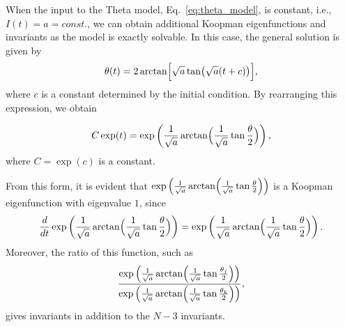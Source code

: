\documentclass[
amsmath,amssymb,
]{revtex4-2}
\begin{document}
When the input to the Theta model, Eq.~\eqref{eq:theta_model}, is constant, i.e., $I(t)= a =const.$, 
we can obtain additional Koopman eigenfunctions and invariants as the model is exactly solvable.
%
In this case, the general solution is given by
\begin{align}
\theta(t)
  = 2\arctan\Bigl[\sqrt{a}\tan\bigl(\sqrt{a}(t+c)\bigr)\Bigr], 
\end{align}
where $c$ is a constant determined by the initial condition. By rearranging this expression, we obtain

\begin{align}
    \label{eq:eigenfunction_for_theta_model}
    C\exp(t) = \exp\left(\frac{1}{\sqrt{a}}\arctan\Bigl(
        \frac{1}{\sqrt{a}}\tan\frac{\theta}{2}
      \Bigr)\right),
\end{align}
where $C = \exp(c)$ is a constant.

From this form, it is evident that $\exp\left(\frac{1}{\sqrt{a}}\arctan\Bigl(\frac{1}{\sqrt{a}}\tan\frac{\theta}{2}\Bigr)\right)$ is a Koopman eigenfunction with eigenvalue $1$, since
\begin{align}
    \frac{d}{dt} \exp\left(\frac{1}{\sqrt{a}}
      \arctan\Bigl(
        \frac{1}{\sqrt{a}}
        \tan\frac{\theta}{2}
      \Bigr)\right) = \exp\left(\frac{1}{\sqrt{a}}
      \arctan\Bigl(
        \frac{1}{\sqrt{a}}
        \tan\frac{\theta}{2}
      \Bigr)\right).
\end{align}
%
Moreover, the ratio of this function, such as
%
\begin{align}
    \frac{ \exp\left(\frac{1}{\sqrt{a}}
      \arctan\Bigl(
        \frac{1}{\sqrt{a}}
        \tan\frac{\theta_j}{2}
      \Bigr)\right)}{ \exp\left(\frac{1}{\sqrt{a}}
      \arctan\Bigl(
        \frac{1}{\sqrt{a}}
        \tan\frac{\theta_k}{2}
      \Bigr)\right)},
\end{align}
%
gives invariants in addition to the $N-3$ invariants.
%
\end{document}
